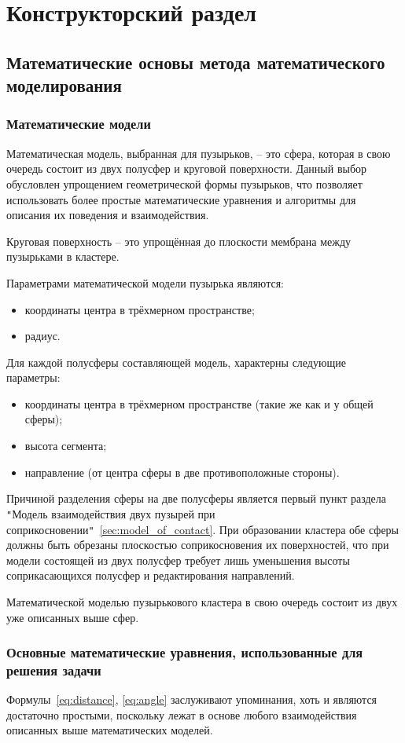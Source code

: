 \chapter{Конструкторский раздел}
\section{Математические основы метода математического моделирования}
\subsection{Математические модели}
Математическая модель, выбранная для пузырьков, -- это сфера, которая в свою очередь состоит из двух полусфер и круговой поверхности. Данный выбор обусловлен упрощением геометрической формы пузырьков, что позволяет использовать более простые математические уравнения и алгоритмы для описания их поведения и взаимодействия.

Круговая поверхность -- это упрощённая до плоскости мембрана между пузырьками в кластере.

Параметрами математической модели пузырька являются:
\begin{itemize}
	\item координаты центра в трёхмерном пространстве;
	\item радиус.
\end{itemize}

Для каждой полусферы составляющей модель, характерны следующие параметры:
\begin{itemize}	
	\item координаты центра в трёхмерном пространстве (такие же как и у общей сферы);
	\item высота сегмента;
	\item направление (от центра сферы в две противоположные стороны).
\end{itemize}

Причиной разделения сферы на две полусферы является первый пункт раздела \verb|"|Модель взаимодействия двух пузырей при соприкосновении\verb|"|~\ref{sec:model_of_contact}. При образовании кластера обе сферы должны быть обрезаны плоскостью соприкосновения их поверхностей, что при модели состоящей из двух полусфер требует лишь уменьшения высоты соприкасающихся полусфер и редактирования направлений.

Математической моделью пузырькового кластера в свою очередь состоит из двух уже описанных выше сфер. 

\subsection{Основные математические уравнения, использованные для решения задачи}
Формулы~\ref{eq:distance}, \ref{eq:angle} заслуживают упоминания, хоть и являются достаточно простыми, поскольку лежат в основе любого взаимодействия описанных выше математических моделей.

